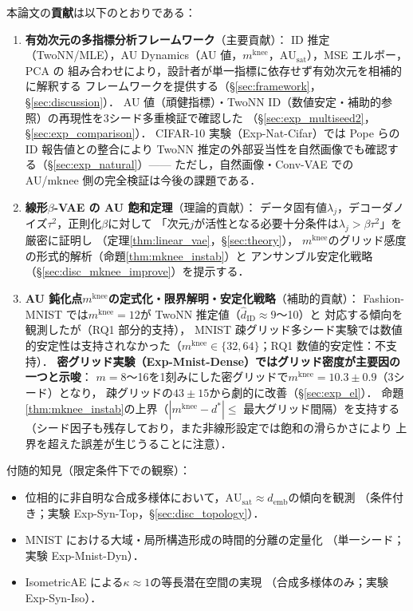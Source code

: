 \documentclass[11pt,a4paper]{jsarticle}
\newcommand{\kap}{\kappa}
\newcommand{\AUsat}{\mathrm{AU}_{\mathrm{sat}}}
\newcommand{\mknee}{m^{\mathrm{knee}}}
\newcommand{\demb}{d_{\mathrm{emb}}}
\begin{document}
本論文の\textbf{貢献}は以下のとおりである：
\begin{enumerate}
  \item \textbf{有効次元の多指標分析フレームワーク}（主要貢献）：
        ID 推定（TwoNN/MLE），AU Dynamics（AU 値，$\mknee$，$\AUsat$），MSE エルボー，PCA の
        組み合わせにより，設計者が単一指標に依存せず有効次元を相補的に解釈する
        フレームワークを提供する（§\ref{sec:framework}，§\ref{sec:discussion}）．
        AU 値（頑健指標）・TwoNN ID（数値安定・補助的参照）の再現性を3シード多重検証で確認した
        （§\ref{sec:exp_multiseed2}，§\ref{sec:exp_comparison}）．
        CIFAR-10 実験（Exp-Nat-Cifar）では Pope ら\cite{pope2021intrinsic}の ID 報告値との整合により
        TwoNN 推定の外部妥当性を自然画像でも確認する（§\ref{sec:exp_natural}）——
        ただし，自然画像・Conv-VAE での AU/mknee 側の完全検証は今後の課題である．
  \item \textbf{線形$\beta$-VAE の AU 飽和定理}（理論的貢献）：
        データ固有値$\lambda_j$，デコーダノイズ$\tau^2$，正則化$\beta$に対して
        「次元$j$が活性となる必要十分条件は$\lambda_j > \beta\tau^2$」を厳密に証明し
        （定理\ref{thm:linear_vae}，§\ref{sec:theory}），
        $\mknee$のグリッド感度の形式的解析（命題\ref{thm:mknee_instab}）と
        アンサンブル安定化戦略（§\ref{sec:disc_mknee_improve}）を提示する．
  \item \textbf{AU 鈍化点$\mknee$の定式化・限界解明・安定化戦略}（補助的貢献）：
        Fashion-MNIST では$\mknee = 12$が TwoNN 推定値（$\hat{d}_\mathrm{ID} \approx 9$〜10）と
        対応する傾向を観測したが（RQ1 部分的支持），
        MNIST 疎グリッド多シード実験では数値的安定性は支持されなかった（$\mknee \in \{32,64\}$；RQ1 数値的安定性：不支持）．
        \textbf{密グリッド実験（Exp-Mnist-Dense）ではグリッド密度が主要因の一つと示唆}：
        $m=8$〜16を1刻みにした密グリッドで$\mknee = 10.3 \pm 0.9$（3シード）となり，
        疎グリッドの$43 \pm 15$から劇的に改善（§\ref{sec:exp_el}）．
        命題\ref{thm:mknee_instab}の上界（$|\mknee - d^*| \leq$ 最大グリッド間隔）を支持する
        （シード因子も残存しており，また非線形設定では飽和の滑らかさにより
        上界を超えた誤差が生じうることに注意）．
\end{enumerate}

付随的知見（限定条件下での観察）：
\begin{itemize}
  \item 位相的に非自明な合成多様体において，$\AUsat \approx \demb$の傾向を観測
        （条件付き；実験 Exp-Syn-Top，§\ref{sec:disc_topology}）．
  \item MNIST における大域・局所構造形成の時間的分離の定量化
        （単一シード；実験 Exp-Mnist-Dyn）．
  \item IsometricAE による$\kap \approx 1$の等長潜在空間の実現
        （合成多様体のみ；実験 Exp-Syn-Iso）．
\end{itemize}
\end{document}
